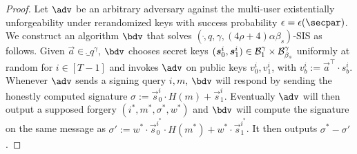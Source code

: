\begin{proof}
  Let $\adv$ be an arbitrary adversary against the multi-user existentially unforgeability under rerandomized keys with success probability $\epsilon = \epsilon(\secpar)$.
  We construct an algorithm $\bdv$ that solves $(\ring,q,\gamma,(4\rho + 4)\alpha\beta_s)$-SIS as follows.
  Given $\vec{a}\in\ring_q^\gamma$, $\bdv$ chooses secret keys $(\boldsymbol{s}^i_0,\boldsymbol{s}^i_1) \in \mathcal{B}_{1}^\gamma\times \mathcal{B}_{\beta_s}^\gamma$ uniformly at random for $i\in[T-1]$ and invokes $\adv$ on public keys $v^i_0,v^i_1$, with $v^i_b := \vec{a}^\intercal\cdot s^i_b$.
  Whenever $\adv$ sends a signing query $i,m$, $\bdv$ will respond by sending the honestly computed signature $\sigma:=\vec{s}^i_0\cdot H(m)+ \vec{s}^i_1$.
  Eventually $\adv$ will then output a supposed forgery $(i^*,m^*,\sigma^*,w^*)$ and $\bdv$ will compute the signature on the same message as $\sigma' := w^*\cdot\vec{s}^{i^*}_0\cdot H(m^*)+ w^*\cdot\vec{s}^{i^*}_1$.
  It then outputs $\sigma^*-\sigma'$.
  
  

\end{proof}
